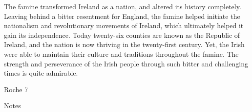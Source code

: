 \begin{Spacing}{1.5}

\hspace{.4in}The famine transformed Ireland as a nation, and altered its history completely. Leaving behind a bitter resentment for England, the famine helped initiate the nationalism and revolutionary movements of Ireland, which ultimately helped it gain its independence. Today twenty-six counties are known as the Republic of Ireland, and the nation is now thriving in the twenty-first century. Yet, the Irish were able to maintain their culture and traditions throughout the famine. The strength and perseverance of the Irish people through such bitter and challenging times is quite admirable. 

\newpage

\thispagestyle{empty}
\begin{flushright}Roche 7\end{flushright}
\begin{center}Notes\end{center}


\end{Spacing}
